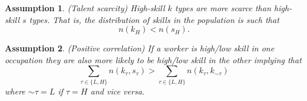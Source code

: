\documentclass[12 pt]{article}
\newtheorem{assumption}{Assumption} %
\begin{document}
\begin{assumption}
	(Talent scarcity) High-skill $k$ types are more scarce than high-skill $s$ types.  That is, the distribution of skills in the population is such that
	\begin{equation*}
		n(k_H) < n(s_H).
	\end{equation*}
	\label{ass:scarcity}
\end{assumption}

\begin{assumption}
	(Positive correlation) If a worker is high/low skill in one occupation they are also more likely to be high/low skill in the other implying that
	\begin{equation*}
		\sum_{\tau\in\{L,H\}}n(k_\tau,s_\tau) > \sum_{\tau\in\{L,H\}}n(k_\tau,k_{\sim \tau})
	\end{equation*}
	where $\sim \tau = L$ if $\tau = H$ and vice versa. 
	\label{ass:correl}
\end{assumption}
\end{document}
